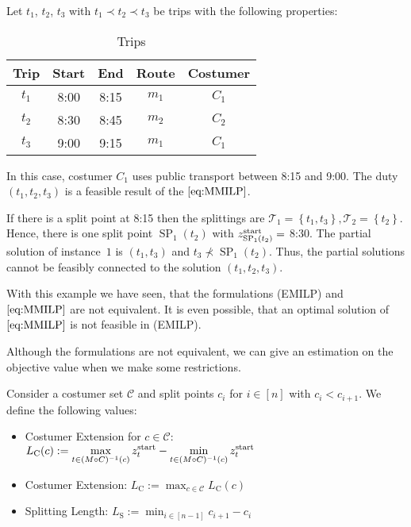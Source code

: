 \begin{example}

Let $t_1$, $t_2$, $t_3$ with $t_1\prec t_2\prec t_3$ be trips with the following properties: 

\begin{table}[ht]
	\centering
	\begin{tabular}{c|cccc}
		Trip & Start & End & Route & Costumer \\
		\hline
		$t_1$ & 8:00 & 8:15 & $m_1$ & $C_1$ \\
		$t_2$ & 8:30 & 8:45 & $m_2$ & $C_2$ \\
		$t_3$ & 9:00 & 9:15 & $m_1$ & $C_1$ \\
	\end{tabular}
	\caption{Trips}
\end{table}

In this case, costumer $C_1$ uses public transport between 8:15 and 9:00. The duty $\left(t_1,t_2,t_3\right)$ is a feasible result of the $\eqref{eq:MMILP}$.

If there is a split point at 8:15 then the splittings are $\mathcal{T}_1=\left\{t_1,t_3\right\},\mathcal{T}_2=\left\{t_2\right\}$. Hence, there is one split point $\operatorname{SP}_1\left(t_2\right)$ with $z^{\operatorname{start}}_{\operatorname{SP}_1\left(t_2\right)} =$ 8:30. The partial solution of instance~$1$ is $\left(t_1,t_3\right)$ and $t_3\not\prec \operatorname{SP}_1\left(t_2\right)$. Thus, the partial solutions cannot be feasibly connected to the solution $\left(t_1,t_2,t_3\right)$.

\end{example}

With this example we have seen, that the formulations (EMILP) and $\eqref{eq:MMILP}$ are not equivalent. It is even possible, that an optimal solution of $\eqref{eq:MMILP}$ is not feasible in (EMILP).

Although the formulations are not equivalent, we can give an estimation on the objective value when we make some restrictions.

\begin{definition}

Consider a costumer set $\mathcal{C}$ and split points $c_i$ for $i\in[n]$ with $c_i<c_{i+1}$. We define the following values:

\begin{itemize}
	\item{Costumer Extension for $c\in\mathcal{C}$: $\displaystyle{L_{\operatorname{C}}(c) := \max_{t\in(M\circ C)^{-1}(c)}z^{\operatorname{start}}_t - \min_{t\in(M\circ C)^{-1}(c)}z^{\operatorname{start}}_t}$}
	\item{Costumer Extension: $\displaystyle{L_{\operatorname{C}} := \max_{c\in\mathcal{C}} L_{\operatorname{C}}(c)}$}
	\item{Splitting Length: $\displaystyle{L_{\operatorname{S}} := \min_{i\in[n-1]} c_{i+1}-c_i}$}
\end{itemize}

\end{definition}

